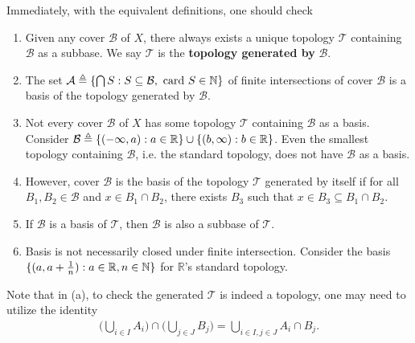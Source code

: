 \documentclass{report}
\begin{document}
\begin{mdframed}
Immediately, with the equivalent definitions, one should check
\begin{enumerate}[label=(\alph*)]
    \item Given any cover $\mathcal{B}$ of $X$, there always exists a unique topology $\mathscr{T}$ containing $\mathcal{B}$ as a subbase. We say $\mathscr{T}$ is the \textbf{topology generated by} $\mathcal{B}$.
    \item The set $\mathcal{A} \triangleq \{  \bigcap S : S \subseteq \mathcal{B}, \text{ card }S \in \mathbb{N}  \}$ of finite intersections of cover $\mathcal{B}$ is a basis of the topology generated by $\mathcal{B}$.
    \item Not every cover $\mathcal{B}$ of $X$ has some topology $\mathscr{T}$ containing $\mathcal{B}$ as a basis. Consider $\mathcal{B} \triangleq \{  (-\infty, a) : a \in \mathbb{R}  \} \cup \{  (b, \infty) : b \in \mathbb{R}  \}$. Even the smallest topology containing $\mathcal{B}$, i.e. the standard topology, does not have $\mathcal{B}$ as a basis.
    \item However, cover $\mathcal{B}$ is the basis of the topology $\mathscr{T}$ generated by itself if for all $B_1, B_2 \in \mathcal{B}$ and $x \in B_1 \cap B_2$, there exists $B_3$ such that $x \in B_3 \subseteq B_1 \cap B_2$.
    \item If $\mathcal{B}$ is a basis of $\mathscr{T}$, then $\mathcal{B}$ is also a subbase of $\mathscr{T}$.
    \item Basis is not necessarily closed under finite intersection. Consider the basis $\{ (a, a + \frac{1}{n}) : a \in \mathbb{R}, n \in \mathbb{N} \}$ for $\mathbb{R}$'s standard topology. 
\end{enumerate}

Note that in (a), to check the generated $\mathscr{T}$ is indeed a topology, one may need to utilize the identity
\begin{align*}
\Big( \bigcup_{i \in I} A_i \Big) \cap \Big( \bigcup_{j \in J} B_j \Big) = \bigcup_{i \in I, j \in J} A_i \cap B_j.
\end{align*}




\end{mdframed}
\end{document}
